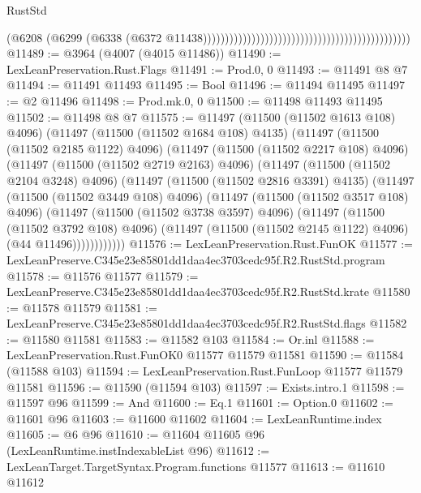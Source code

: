 \begin{lexlean}{RustStd}
\begin{coremodule}
                                                                                          (@6208
                                                                                            (@6299
                                                                                              (@6338
                                                                                                (@6372
                                                                                                  @11438)))))))))))))))))))))))))))))))))))))))))))))))
@11489 := @3964 (@4007 (@4015 @11486))
@11490 := LexLeanPreservation.Rust.Flags
@11491 := Prod.{0, 0}
@11493 := @11491 @8 @7
@11494 := @11491 @11493
@11495 := Bool
@11496 := @11494 @11495
@11497 := @2 @11496
@11498 := Prod.mk.{0, 0}
@11500 := @11498 @11493 @11495
@11502 := @11498 @8 @7
@11575 := @11497
    (@11500 (@11502 @1613 @108) @4096)
    (@11497
      (@11500 (@11502 @1684 @108) @4135)
      (@11497
        (@11500 (@11502 @2185 @1122) @4096)
        (@11497
          (@11500 (@11502 @2217 @108) @4096)
          (@11497
            (@11500 (@11502 @2719 @2163) @4096)
            (@11497
              (@11500 (@11502 @2104 @3248) @4096)
              (@11497
                (@11500 (@11502 @2816 @3391) @4135)
                (@11497
                  (@11500 (@11502 @3449 @108) @4096)
                  (@11497
                    (@11500 (@11502 @3517 @108) @4096)
                    (@11497
                      (@11500 (@11502 @3738 @3597) @4096)
                      (@11497
                        (@11500 (@11502 @3792 @108) @4096)
                        (@11497 (@11500 (@11502 @2145 @1122) @4096) (@44 @11496))))))))))))
@11576 := LexLeanPreservation.Rust.FunOK
@11577 := LexLeanPreserve.C345e23e85801dd1daa4ec3703cedc95f.R2.RustStd.program
@11578 := @11576 @11577
@11579 := LexLeanPreserve.C345e23e85801dd1daa4ec3703cedc95f.R2.RustStd.krate
@11580 := @11578 @11579
@11581 := LexLeanPreserve.C345e23e85801dd1daa4ec3703cedc95f.R2.RustStd.flags
@11582 := @11580 @11581
@11583 := @11582 @103
@11584 := Or.inl
@11588 := LexLeanPreservation.Rust.FunOK0 @11577 @11579 @11581
@11590 := @11584 (@11588 @103)
@11594 := LexLeanPreservation.Rust.FunLoop @11577 @11579 @11581
@11596 := @11590 (@11594 @103)
@11597 := Exists.intro.{1}
@11598 := @11597 @96
@11599 := And
@11600 := Eq.{1}
@11601 := Option.{0}
@11602 := @11601 @96
@11603 := @11600 @11602
@11604 := LexLeanRuntime.index
@11605 := @6 @96
@11610 := @11604 @11605 @96 (LexLeanRuntime.instIndexableList @96)
@11612 := LexLeanTarget.TargetSyntax.Program.functions @11577
@11613 := @11610 @11612

\end{coremodule}
\end{lexlean}
